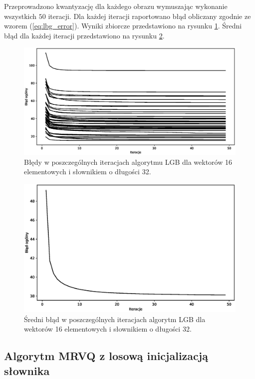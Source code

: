 \documentclass{article}
\begin{document}
Przeprowadzono kwantyzację dla każdego obrazu wymuszając wykonanie wszystkich $50$ iteracji. Dla każdej iteracji raportowano błąd obliczany zgodnie ze wzorem (\ref{eq:lbg_error}). Wyniki zbiorcze przedstawiono na rysunku \ref{fig:lbg_iterations}. Średni błąd dla każdej iteracji przedstawiono na rysunku \ref{fig:lbg_iterations_mean}.

\begin{figure}[H]
  \centering
  \centering
  \includegraphics[width=.9\linewidth]{images/lbg_4x4_32_50_iterations.eps}
  \caption{Błędy w poszczególnych iteracjach algorytmu LGB dla wektorów 16 elementowych i słownikiem o długości 32.}
  \label{fig:lbg_iterations}
\end{figure}

\begin{figure}[H]
  \centering
  \includegraphics[width=.9\linewidth]{images/lbg_4x4_32_mean_iterations.eps}
  \caption{Średni błąd w poszczególnych iteracjach algorytm LGB dla wektorów 16 elementowych i słownikiem o długości 32.}
  \label{fig:lbg_iterations_mean}
\end{figure}

\subsection{Algorytm MRVQ z losową inicjalizacją słownika}
\end{document}
